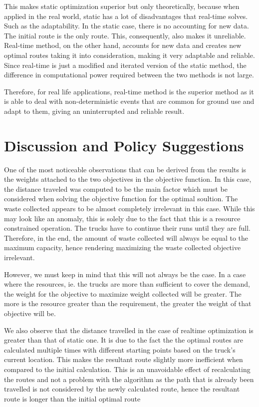\documentclass[12pt]{article}
\begin{document}
This makes static optimization superior but only theoretically, because when applied in the real world, static has a lot of disadvantages that real-time solves. Such as the adaptability. In the static case, there is no accounting for new data. The initial route is the only route. This, consequently, also makes it unreliable. Real-time method, on the other hand, accounts for new data and creates new optimal routes taking it into consideration, making it very adaptable and reliable. Since real-time is just a modified and iterated version of the static method, the difference in computational power required between the two methods is not large. 

Therefore, for real life applications, real-time method is the superior method as it is able to deal with non-deterministic events that are common for ground use and adapt to them, giving an uninterrupted and reliable result.


\section{Discussion and Policy Suggestions}
One of the most noticeable observations that can be derived from the results is the weights attached to the two objectives in the objective function. In this case, the distance traveled was computed to be the main factor which must be considered when solving the objective function for the optimal soultion. The waste collected appears to be almost completely irrelevant in this case. While this may look like an anomaly, this is solely due to the fact that this is a resource constrained operation. The trucks  have to continue their runs until they are full. Therefore, in the end, the amount of waste collected will always be equal to the maximum capacity, hence rendering maximizing the waste collected objective irrelevant.

However, we must keep in mind that this will not always be the case. In a case where the resources, ie. the trucks are more than sufficient to cover the demand, the weight for the objective to maximize weight collected will be greater. The more is the resource greater than the requirement, the greater the weight of that objective will be.

We also observe that the distance travelled in the case of realtime optimization is greater than that of static one. It is due to the fact the the optimal routes are calculated multiple times with different starting points based on the truck's current location. This makes the resultant route slightly more inefficient when compared to the initial calculation. This is an unavoidable effect of recalculating the routes and not a problem with the algorithm as the path that is already been travelled is not considered by the newly calculated route, hence the resultant route is longer than the initial optimal route
\end{document}
